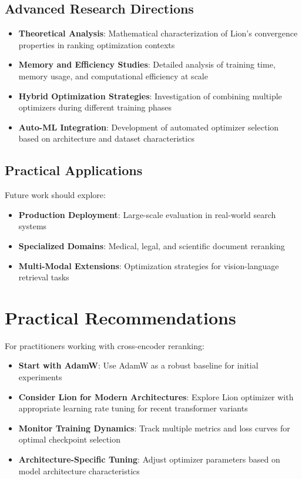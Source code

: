 \subsection{Advanced Research Directions}

\begin{itemize}
    \item \textbf{Theoretical Analysis}: Mathematical characterization of Lion's convergence properties in ranking optimization contexts
    
    \item \textbf{Memory and Efficiency Studies}: Detailed analysis of training time, memory usage, and computational efficiency at scale
    
    \item \textbf{Hybrid Optimization Strategies}: Investigation of combining multiple optimizers during different training phases
    
    \item \textbf{Auto-ML Integration}: Development of automated optimizer selection based on architecture and dataset characteristics
\end{itemize}

\subsection{Practical Applications}

Future work should explore:
\begin{itemize}
    \item \textbf{Production Deployment}: Large-scale evaluation in real-world search systems
    \item \textbf{Specialized Domains}: Medical, legal, and scientific document reranking
    \item \textbf{Multi-Modal Extensions}: Optimization strategies for vision-language retrieval tasks
\end{itemize}

\section{Practical Recommendations}

For practitioners working with cross-encoder reranking:

\begin{itemize}
    \item \textbf{Start with AdamW}: Use AdamW as a robust baseline for initial experiments
    \item \textbf{Consider Lion for Modern Architectures}: Explore Lion optimizer with appropriate learning rate tuning for recent transformer variants
    \item \textbf{Monitor Training Dynamics}: Track multiple metrics and loss curves for optimal checkpoint selection
    \item \textbf{Architecture-Specific Tuning}: Adjust optimizer parameters based on model architecture characteristics
\end{itemize}


